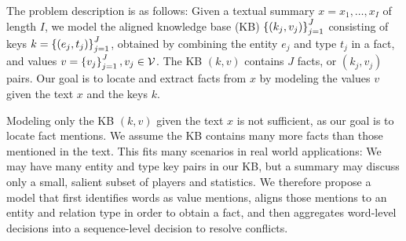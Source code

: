 \documentclass[12pt]{article}
\begin{document}
\begin{comment}
(Move or delete later)
A \textit{mention} is a surface realization of an abstract object in text.
In relation extraction we justify extractions by identifying fact mentions.
As text is noisy, the realization of a fact may be difficult to locate.
We focus on locating fact mentions at the word level by identifying
individual words as value mentions, rather than entity or type mentions.
We define a `word-level' decision, value, or process as pertaining to individual words,
while `sequence-level' refers to a single decision, value, or process for a whole sequence.
\end{comment}

\begin{comment}
Note on related work:
Except for \citet{zeng2018copy}, prior work has either assumed that the locations of
entities and values are given as input features or that the locations of entities and values
are observed at training time.
\end{comment}

The problem description is as follows:
Given a textual summary $x = x_1, \ldots, x_{I}$ of length $I$,
we model the aligned knowledge base (KB) $\left\{(k_j, v_j)\right\}_{j=1}^J$
consisting of keys $k = \left\{(e_j, t_j)\right\}_{j=1}^J$, 
obtained by combining the entity $e_j$ and type $t_j$ in a fact,
and values $v = \left\{v_j\right\}_{j=1}^J, v_j \in \mathcal{V}$.
The KB $(k,v)$ contains $J$ facts, or $(k_j, v_j)$ pairs.
Our goal is to locate and extract facts from $x$ by modeling the values $v$
given the text $x$ and the keys $k$.

Modeling only the KB $(k,v)$ given the text $x$
is not sufficient, as our goal is to locate fact mentions.
We assume the KB contains many more facts than those mentioned in the text.
This fits many scenarios in real world applications:
We may have many entity and type key pairs in our KB,
but a summary may discuss only a small, salient subset of players and statistics.
We therefore propose a model that first identifies words as value mentions,
aligns those mentions to an entity and relation type in order to obtain a fact, 
and then aggregates word-level decisions into a sequence-level decision to resolve conflicts.
\end{document}
